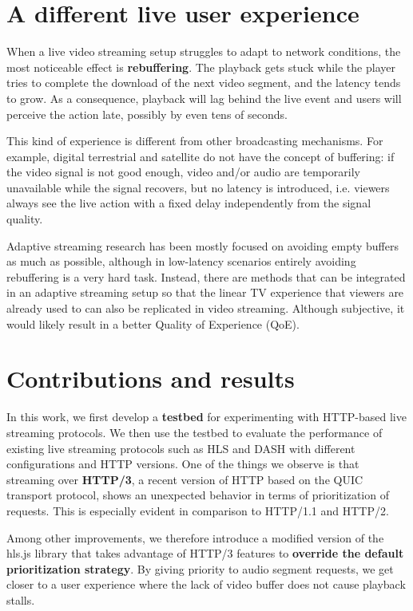 \section{A different live user experience}
\label{sec:intro/experience}

When a live video streaming setup struggles to adapt to network conditions, the most noticeable effect is \textbf{rebuffering}. The playback gets stuck while the player tries to complete the download of the next video segment, and the latency tends to grow. As a consequence, playback will lag behind the live event and users will perceive the action late, possibly by even tens of seconds.

This kind of experience is different from other broadcasting mechanisms. For example, digital terrestrial and satellite do not have the concept of buffering: if the video signal is not good enough, video and/or audio are temporarily unavailable while the signal recovers, but no latency is introduced, i.e. viewers always see the live action with a fixed delay independently from the signal quality.

Adaptive streaming research has been mostly focused on avoiding empty buffers as much as possible, although in low-latency scenarios entirely avoiding rebuffering is a very hard task. Instead, there are methods that can be integrated in an adaptive streaming setup so that the linear TV experience that viewers are already used to can also be replicated in video streaming. Although subjective, it would likely result in a better Quality of Experience (QoE).

\section{Contributions and results}
\label{sec:intro/contributions}

In this work, we first develop a \textbf{testbed} for experimenting with HTTP-based live streaming protocols. We then use the testbed to evaluate the performance of existing live streaming protocols such as HLS and DASH with different configurations and HTTP versions. One of the things we observe is that streaming over \textbf{HTTP/3}, a recent version of HTTP based on the QUIC transport protocol, shows an unexpected behavior in terms of prioritization of requests. This is especially evident in comparison to HTTP/1.1 and HTTP/2.

Among other improvements, we therefore introduce a modified version of the hls.js library that takes advantage of HTTP/3 features to \textbf{override the default prioritization strategy}. By giving priority to audio segment requests, we get closer to a user experience where the lack of video buffer does not cause playback stalls.

